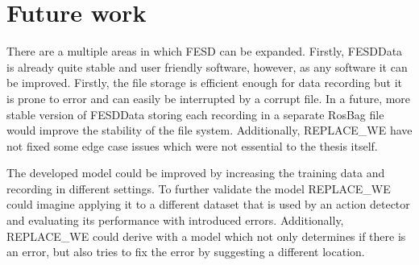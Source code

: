 \section{Future work}
\label{sec:future_work}

There are a multiple areas in which FESD can be expanded. Firstly, FESDData is already quite stable and user friendly software, however, as any software it can be improved. Firstly, the file storage is efficient enough for data recording but it is prone to error and can easily be interrupted by a corrupt file. In a future, more stable version of FESDData storing each recording in a separate RosBag file would improve the stability of the file system. Additionally, REPLACE_WE have not fixed some edge case issues which were not essential to the thesis itself.

The developed model could be improved by increasing the training data and recording in different settings. To further validate the model REPLACE_WE could imagine applying it to a different dataset that is used by an action detector and evaluating its performance with introduced errors. Additionally, REPLACE_WE could derive with a model which not only determines if there is an error, but also tries to fix the error by suggesting a different location.

